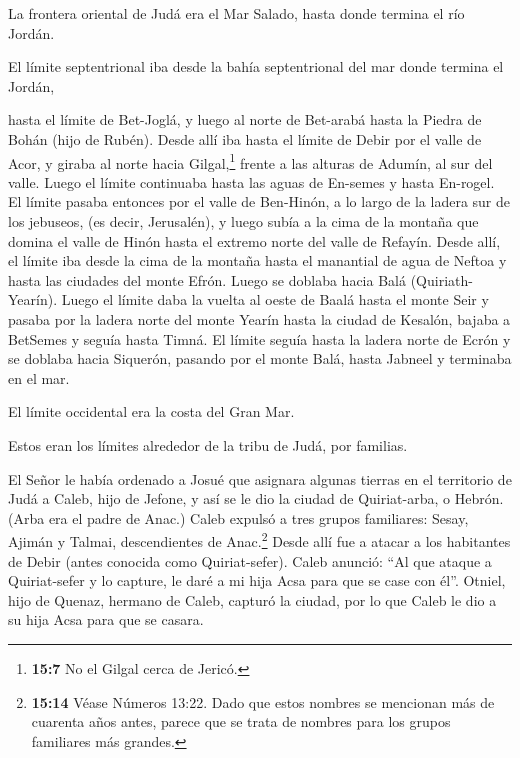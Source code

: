 La frontera oriental de Judá era el Mar Salado, hasta donde
termina el río Jordán.

El límite septentrional iba desde la bahía septentrional del mar donde
termina el Jordán,

 hasta el límite de Bet-Joglá, y luego al norte de Bet-arabá
hasta la Piedra de Bohán (hijo de Rubén).  Desde allí iba
hasta el límite de Debir por el valle de Acor, y giraba al norte hacia
Gilgal,\footnote{\textbf{15:7} No el Gilgal cerca de Jericó.} frente a
las alturas de Adumín, al sur del valle. Luego el límite continuaba
hasta las aguas de En-semes y hasta En-rogel.  El límite
pasaba entonces por el valle de Ben-Hinón, a lo largo de la ladera sur
de los jebuseos, (es decir, Jerusalén), y luego subía a la cima de la
montaña que domina el valle de Hinón hasta el extremo norte del valle de
Refayín.  Desde allí, el límite iba desde la cima de la
montaña hasta el manantial de agua de Neftoa y hasta las ciudades del
monte Efrón. Luego se doblaba hacia Balá (Quiriath-Yearín).
 Luego el límite daba la vuelta al oeste de Baalá hasta el
monte Seir y pasaba por la ladera norte del monte Yearín hasta la ciudad
de Kesalón, bajaba a BetSemes y seguía hasta Timná.  El
límite seguía hasta la ladera norte de Ecrón y se doblaba hacia
Siquerón, pasando por el monte Balá, hasta Jabneel y terminaba en el
mar.

 El límite occidental era la costa del Gran Mar.~

Estos eran los límites alrededor de la tribu de Judá, por familias.

 El Señor le había ordenado a Josué que asignara algunas
tierras en el territorio de Judá a Caleb, hijo de Jefone, y así se le
dio la ciudad de Quiriat-arba, o Hebrón. (Arba era el padre de Anac.)
 Caleb expulsó a tres grupos familiares: Sesay, Ajimán y
Talmai, descendientes de Anac.\footnote{\textbf{15:14} Véase Números
  13:22. Dado que estos nombres se mencionan más de cuarenta años antes,
  parece que se trata de nombres para los grupos familiares más grandes.}
 Desde allí fue a atacar a los habitantes de Debir (antes
conocida como Quiriat-sefer).  Caleb anunció: ``Al que
ataque a Quiriat-sefer y lo capture, le daré a mi hija Acsa para que se
case con él''.  Otniel, hijo de Quenaz, hermano de Caleb,
capturó la ciudad, por lo que Caleb le dio a su hija Acsa para que se
casara.

